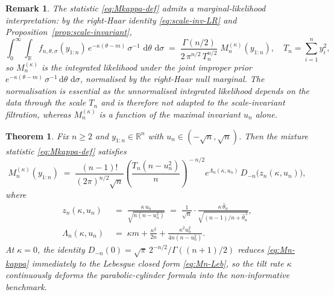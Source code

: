 \documentclass[numsec,webpdf,modern,medium,namedate]{oup-authoring-template}
\theoremstyle{thmstyleone}%
\newtheorem{theorem}{Theorem}%
\theoremstyle{thmstyletwo}%
\newtheorem{remark}{Remark}%
\theoremstyle{thmstylethree}%
\newcommand{\dd}{\,\mathrm{d}}
\newcommand{\1}{\mathbf{1}}
\begin{document}
\begin{remark}\label{rem:marginal-lik}
The statistic \eqref{eq:Mkappa-def} admits a marginal-likelihood interpretation: by the right-Haar identity \eqref{eq:scale-inv-LR} and Proposition~\ref{prop:scale-invariant},
\[
  \int_0^\infty\!\int_\mathbb{R} f_{n,\theta,\sigma}(y_{1:n})\,
  e^{-\kappa(\theta-m)}\,\sigma^{-1}\,\dd\theta\,\dd\sigma
  \;=\;\frac{\Gamma(n/2)}{2\,\pi^{n/2}\,T_n^{n/2}}\;M_n^{(\kappa)}(y_{1:n}),
  \quad T_n=\sum_{i=1}^n y_i^2,
\]
so $M_n^{(\kappa)}$ is the integrated likelihood under the joint improper prior $e^{-\kappa(\theta-m)}\,\sigma^{-1}\dd\theta\,\dd\sigma$, normalised by the right-Haar null marginal. The normalisation is essential as the unnormalised integrated likelihood depends on the data through the scale $T_n$ and is therefore not adapted to the scale-invariant filtration, whereas $M_n^{(\kappa)}$ is a function of the maximal invariant $u_n$ alone.
\end{remark}
\begin{theorem}\label{thm:Mn-kappa}
Fix $n\geq 2$ and $y_{1:n}\in\mathbb{R}^n$ with $u_n\in(-\sqrt n,\sqrt n)$.
Then the mixture statistic \eqref{eq:Mkappa-def} satisfies
\begin{equation}\label{eq:Mn-kappa}
  M_n^{(\kappa)}(y_{1:n})
  \;=\;\frac{(n-1)!}{(2\pi)^{n/2}\sqrt n}
  \left(\frac{T_n(n-u_n^2)}{n}\right)^{\!-n/2}\!
  e^{\Lambda_n(\kappa,u_n)}\,
  D_{-n}\!\bigl(z_n(\kappa,u_n)\bigr),
\end{equation}
where
\begin{align}
  z_n(\kappa,u_n)
  &\;=\;\frac{\kappa\,u_n}{\sqrt{n(n-u_n^2)}}
  \;=\;\frac{1}{\sqrt n}\cdot
  \frac{\kappa\,\widehat\theta_n}{\sqrt{(n-1)/n+\widehat\theta_n^{\,2}}},
  \label{eq:zn}\\[2pt]
  \Lambda_n(\kappa,u_n)
  &\;=\;\kappa m+\frac{\kappa^2}{2n}
  +\frac{\kappa^2 u_n^2}{4n(n-u_n^2)}.
  \label{eq:Lambdan}
\end{align}
At $\kappa=0$, the identity $D_{-n}(0)=\sqrt\pi\,2^{-n/2}/\Gamma((n+1)/2)$ reduces \eqref{eq:Mn-kappa} immediately to the Lebesgue closed form \eqref{eq:Mn-Leb}, so the tilt rate $\kappa$ continuously deforms the parabolic-cylinder formula into the non-informative benchmark.
\end{theorem}
\end{document}
